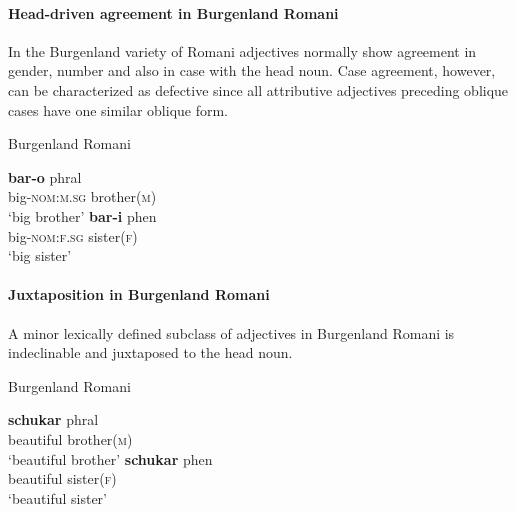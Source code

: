 \paragraph*{Head\hyp{}driven agreement in Burgenland Romani}
\label{romani synchr}
In the Burgenland variety of Romani adjectives normally show agreement in gender, number and also in case with the head noun. Case agreement, however, can be characterized as defective since all attributive adjectives preceding oblique cases have one similar oblique form.
\begin{exe}
\ex \rm{Burgenland Romani \citep[22–23]{halwachs-etal2002}}
\begin{xlist} 
\ex 
\gll	\textbf{bar-o} phral\\
	big-\textsc{nom:m.sg} brother(\textsc{m})\\
\glt	‘big brother’
\ex
\gll	\textbf{bar-i} phen\\
	big-\textsc{nom:f.sg} sister(\textsc{f})\\
\glt	‘big sister’
\end{xlist}
\end{exe}

\paragraph*{Juxtaposition in Burgenland Romani}
A minor lexically defined subclass of adjectives in Burgenland Romani is indeclinable and juxtaposed to the head noun.
\begin{exe}
\ex \rm{Burgenland Romani \citep[22–23]{halwachs-etal2002}}
\begin{xlist}
\ex 
\gll	\textbf{schukar} phral\\
	beautiful brother(\textsc{m})\\
\glt	‘beautiful brother’
\ex
\gll	\textbf{schukar} phen\\
	beautiful sister(\textsc{f})\\
\glt	‘beautiful sister’
\end{xlist}
\end{exe}

